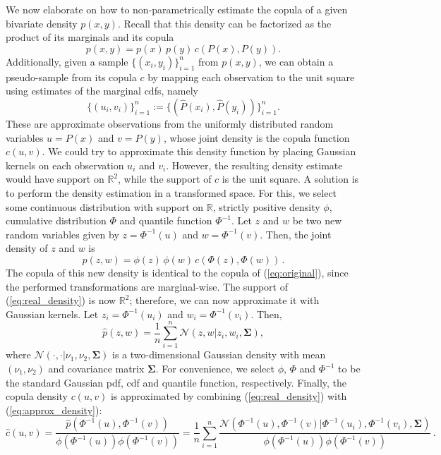 \documentclass{article}
\begin{document}
We now elaborate on how to non-parametrically estimate the copula of a given
bivariate density $p(x,y)$. Recall that this density can be factorized as the
product of its marginals and its copula
\begin{equation}
 p(x,y) = p(x)\,p(y)\,c(P(x),P(y))\label{eq:original}.
\end{equation}
Additionally, given a sample $\{(x_i, y_i)\}_{i=1}^n$ from $p(x,y)$, we can
obtain a pseudo-sample from its copula $c$ by mapping each observation to the
unit square using estimates of the marginal cdfs, namely
\begin{equation}
\{(u_i,v_i)\}_{i=1}^n := \{(\hat{P}(x_i), \hat{P}(y_i))\}_{i=1}^n.
\end{equation}
These are approximate observations from the uniformly distributed random
variables $u=P(x)$ and $v=P(y)$, whose joint density is the copula function
$c(u,v)$. We could try to approximate this density function by placing Gaussian
kernels on each observation $u_i$ and $v_i$.  However, the resulting density
estimate would have support on $\mathbb{R}^2$, while the support of $c$ is the
unit square.  A solution is to perform the density estimation in a transformed
space. For this, we select some continuous distribution with support on
$\mathbb{R}$, strictly positive density $\phi$, cumulative distribution $\Phi$
and quantile function $\Phi^{-1}$. Let $z$ and $w$ be two new random variables
given by $z = \Phi^{-1}(u)$ and $w = \Phi^{-1}(v)$. Then, the joint density of
$z$ and $w$ is \begin{equation} p(z,w) =
\phi(z)\,\phi(w)\,c(\Phi(z),\Phi(w))\,.\label{eq:real_density} \end{equation}
The copula of this new density is identical to the copula of
(\ref{eq:original}), since the performed transformations are marginal-wise.
The support of (\ref{eq:real_density}) is now $\mathbb{R}^2$; therefore, we can
now approximate it with Gaussian kernels.  Let $z_i = \Phi^{-1}(u_i)$ and $w_i
= \Phi^{-1}(v_i)$. Then,
\begin{equation}
\hat{p}(z,w) = \frac{1}{n} \sum_{i=1}^n \mathcal{N}(z,w| z_i, w_i, \bm
\Sigma),\label{eq:approx_density}
\end{equation}
where $\mathcal{N}(\cdot,\cdot| \nu_1,\nu_2,\bm \Sigma)$ is a two-dimensional
Gaussian density with mean $(\nu_1,\nu_2)$ and covariance matrix $\bm
\Sigma$.  For convenience, we select $\phi$, $\Phi$ and $\Phi^{-1}$ to be the
standard Gaussian pdf, cdf and quantile function, respectively.  Finally, the
copula density $c(u,v)$ is approximated by combining (\ref{eq:real_density})
with (\ref{eq:approx_density}):
\begin{equation}
\hat{c}(u,v) =
\frac{\hat{p}(\Phi^{-1}(u),\Phi^{-1}(v))}{\phi(\Phi^{-1}(u))\phi(\Phi^{-1}(v))}
= \frac{1}{n}
\sum_{i=1}^n\frac{\mathcal{N}(\Phi^{-1}(u),\Phi^{-1}(v)| \Phi^{-1}(u_i),
\Phi^{-1}(v_i), \bm \Sigma)}{\phi(\Phi^{-1}(u))\phi(\Phi^{-1}(v))}\,.
\label{eq:kernel_copula}
\end{equation}
\end{document}
